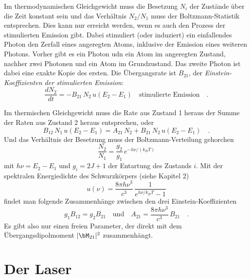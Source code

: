 \begin{marginfigure}
    \caption{Die drei Einstein-Koeffizienten.}
\end{marginfigure}

Im thermodynamischen Gleichgewicht muss die Besetzung $N_i$ der Zustände über die Zeit konstant sein und das Verhältnis $N_2 / N_1$ muss der Boltzmann-Statistik entsprechen. Dies kann nur erreicht werden, wenn es auch den  Prozess der stimulierten Emission gibt. Dabei stimuliert  (oder induziert) ein einfallendes Photon den Zerfall eines angeregten Atoms, inklusive der Emission eines weiteren Photons. Vorher gibt es ein Photon udn ein Atom im angeregten Zustand, nachher  zwei Photonen und ein Atom im Grundzustand. Das zweite Photon ist dabei eine exakte Kopie des ersten. Die Übergangsrate ist $B_{21}$, der  \emph{Einstein-Koeffizienten der stimulierten Emission}:
\begin{equation}
    \frac{d N_2}{dt} = - B_{21} \, N_2 \, u(E_2 - E_1)  \quad \text{stimulierte Emission}  \quad .\label{eq:7_k_stim}
\end{equation}


Im thermischen Gleichgewicht muss die Rate aus Zustand 1 heraus  der Summe der Raten aus Zustand 2 heraus entsprechen, 
oder 
\begin{equation}
    B_{12} \, N_1 \, u(E_2 - E_1) =   A_{21} \, N_2 + B_{21} \, N_2 \, u(E_2 - E_1)  \quad .
\end{equation}
Und das Verhältnis der Besetzung muss der Boltzmann-Verteilung gehorchen
\begin{equation}
    \frac{N_2}{N_1} = \frac{g_2}{g_1} \, e^{- h \nu / (k_B T)}
\end{equation}
mit $h \nu = E_2 - E_1$ und $g_i = 2J +1$ der Entartung des Zustands $i$. Mit der spektralen Energiedichte des Schwarzkörpers (siehe Kapitel 2)
\begin{equation}
    u(\nu) = \frac{8 \pi h \nu^3}{c^3} \,  \frac{1}{e^{h\nu/k_B T} -1}
\end{equation}
findet man folgende Zusammenhänge zwischen den drei Einstein-Koeffizienten
\begin{equation}
   g_1 B_{12}  = g_2 B_{21} \quad \text{und} \quad
   A_{21} = \frac{8 \pi h \nu^3}{c^3}\, B_{21}  \quad. 
\end{equation}
Es gibt also nur einen freien Parameter, der direkt mit dem Übergangsdipolmoment $|\bM_{21}|^2$ zusammenhängt.


\section{Der Laser}

